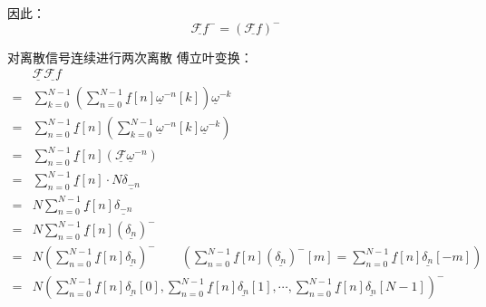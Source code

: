因此：
\begin{equation}
	\underline{\mathcal{F}f}^- = \left( \underline{\mathcal{F}f} \right)^-
\end{equation}

对离散信号连续进行两次离散 傅立叶变换：
\begin{align*}
	  & \underline{\mathcal{F}}\underline{\mathcal{F}f}                                                                                                                                                             \\
	= & \sum_{k=0}^{N-1}\left(\sum_{n=0}^{N-1}\underline{f}[n]\underline{\omega}^{-n}[k]\right)\underline{\omega}^{-k}                                                                                              \\
	= & \sum_{n=0}^{N-1}\underline{f}[n]\left(\sum_{k=0}^{N-1}\underline{\omega}^{-n}[k]\underline{\omega}^{-k}\right)                                                                                              \\
	= & \sum_{n=0}^{N-1}\underline{f}[n]\left(\underline{\mathcal{F}}\underline{\omega}^{-n}\right)                                                                                                                 \\
	= & \sum_{n=0}^{N-1}\underline{f}[n]\cdot N\underline{\delta_{-n}}                                                                                                                                              \\
	= & N\sum_{n=0}^{N-1}\underline{f}[n]\underline{\delta_{-n}}                                                                                                                                                    \\
	= & N\sum_{n=0}^{N-1}\underline{f}[n]\left(\underline{\delta_n}\right)^-                                                                                                                                        \\
	= & N\left(\sum_{n=0}^{N-1}\underline{f}[n]\underline{\delta_n}\right)^-\qquad\left(\sum_{n=0}^{N-1}\underline{f}[n](\underline{\delta_n})^-[m]=\sum_{n=0}^{N-1}\underline{f}[n]\underline{\delta_n}[-m]\right) \\
	= & N\left(\sum_{n=0}^{N-1}\underline{f}[n]\underline{\delta_n}[0],\sum_{n=0}^{N-1}\underline{f}[n]\underline{\delta_n}[1],\cdots,\sum_{n=0}^{N-1}\underline{f}[n]\underline{\delta_n}[N-1]\right)^-
\end{align*}

